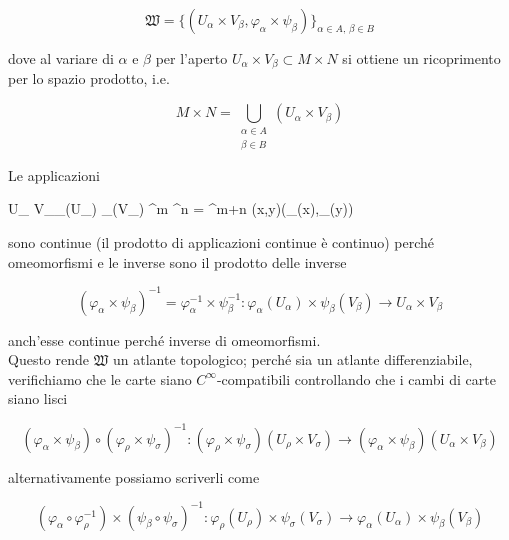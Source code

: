 \begin{equation}
	\mathfrak{W} = \{(U_{\alpha} \times V_{\beta},\varphi_{\alpha} \times \psi_{\beta})\}_{\alpha \in A, \, \beta \in B}
\end{equation}

dove al variare di $ \alpha $ e $ \beta $ per l'aperto $ U_{\alpha} \times V_{\beta} \subset M \times N $ si ottiene un ricoprimento per lo spazio prodotto, i.e.

\begin{equation}
	M \times N = \bigcup_{\substack{ \alpha \in A \\ \beta \in B }} (U_{\alpha} \times V_{\beta})
\end{equation}

Le applicazioni

\map{\varphi_{\alpha} \times \psi_{\beta}}
	{U_{\alpha} \times V_{\beta}}{\varphi_{\alpha}(U_{\alpha}) \times \psi_{\beta}(V_{\beta}) \subset \R^{m} \times \R^{n} = \R^{m+n}}
	{(x,y)}{(\varphi_{\alpha}(x),\psi_{\beta}(y))}

sono continue (il prodotto di applicazioni continue è continuo) perché omeomorfismi e le inverse sono il prodotto delle inverse

\begin{equation}
	(\varphi_{\alpha} \times \psi_{\beta})^{-1} = \varphi_{\alpha}^{-1} \times \psi_{\beta}^{-1} : \varphi_{\alpha}(U_{\alpha}) \times \psi_{\beta}(V_{\beta}) \to U_{\alpha} \times V_{\beta}
\end{equation}

anch'esse continue perché inverse di omeomorfismi. \\
Questo rende $ \mathfrak{W} $ un atlante topologico; perché sia un atlante differenziabile, verifichiamo che le carte siano $ C^{\infty} $-compatibili controllando che i cambi di carte siano lisci

\begin{equation}
	(\varphi_{\alpha} \times \psi_{\beta}) \circ (\varphi_{\rho} \times \psi_{\sigma})^{-1} : (\varphi_{\rho} \times \psi_{\sigma})(U_{\rho} \times V_{\sigma}) \to (\varphi_{\alpha} \times \psi_{\beta})(U_{\alpha} \times V_{\beta})
\end{equation}

alternativamente possiamo scriverli come

\begin{equation}
	(\varphi_{\alpha} \circ \varphi_{\rho}^{-1}) \times (\psi_{\beta} \circ \psi_{\sigma})^{-1} : \varphi_{\rho}(U_{\rho}) \times \psi_{\sigma}(V_{\sigma}) \to \varphi_{\alpha}(U_{\alpha}) \times \psi_{\beta}(V_{\beta})
\end{equation}


